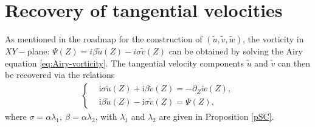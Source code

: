 \documentclass[reqno,11pt]{amsart}
\numberwithin{equation}{section}
\numberwithin{equation}{section}
\theoremstyle{plain}
\begin{document}
\section{Recovery of tangential velocities}\label{sec-recover}
As mentioned in the roadmap for the construction of $(\tilde{u},\tilde{v},\tilde{w})$, the vorticity in $XY-$plane: $\Psi(Z)=i\beta\tilde{u}(Z)-i\sigma\tilde{v}(Z)$ can be obtained by solving the Airy equation \eqref{eq:Airy-vorticity}. The tangential velocity components $\tilde{u}$ and $\tilde{v}$ can then be recovered via the relations
\begin{align}\label{eq:u-v-relation-w-psi}
\left\{
	\begin{aligned}
		&\mathrm{i}\sigma\tilde{u}(Z)+\mathrm{i}\beta\tilde{v}(Z)=-\partial_Z \tilde{w}(Z),\\
		&\mathrm{i}\beta\tilde{u}(Z)-\mathrm{i}\sigma\tilde{v}(Z)=\Psi(Z),
	\end{aligned}
	\right.
\end{align}
where $\sigma=\alpha\lambda_1,~\beta=\alpha\lambda_2$, with $\lambda_1$ and $ \lambda_2$ are given in Proposition \ref{pSC}. \\
\end{document}
